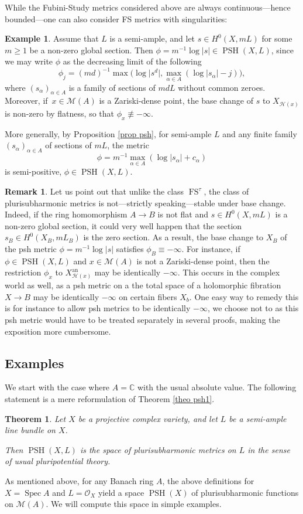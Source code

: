 \documentclass[JEP,XML,SOM,Unicode,published]{cedram}
\newtheorem{theo}[equation]{Theorem}
\theoremstyle{definition}
\newtheorem{ex}[equation]{Example}
\newtheorem{rem}[equation]{Remark}
\newcommand \C{\mathbb C}
\newcommand \gO {\mathcal O}
\newcommand \M {\mathscr {M}}
\newcommand{\an}{\mathrm{an}}
\DeclareMathOperator{\FS}{FS}
\DeclareMathOperator{\PSH}{PSH}
\DeclareMathOperator{\Sp}{Spec}
\begin{document}
While the Fubini-Study metrics considered above are always continuous---hence bounded---one can also consider FS metrics with singularities:
\begin{ex} \label{ex fs sing} Assume that $L$ is a semi-ample, and let $s \in H^0(X, mL)$ for some $m \ge 1$ be a non-zero global section. Then $ \phi =m^{-1} \log \lvert s \rvert \in \PSH(X, L)$, since we may write $\phi$ as the decreasing limit of the following
\[
\phi_j =(md)^{-1} \max \bigl(\log \lvert s^d \rvert , \max_{\alpha \in A} (\log \lvert s_{\alpha} \rvert -j) \bigr),
\]
where $(s_{\alpha})_{\alpha \in A}$ is a family of sections of $mdL$ without common zeroes. Moreover, if~$x \in \M(A)$ is a Zariski-dense point, the base change of $s$ to $X_{\mathscr{H}(x)}$ is non-zero by flatness, so that $\phi_x \not\equiv - \infty$.

More generally, by Proposition \ref{prop psh}, for semi-ample $L$ and any finite family $(s_{\alpha})_{\alpha \in A}$ of sections of $mL$, the metric
\[
\phi = m^{-1} \max_{\alpha \in A} (\log \lvert s_{\alpha} \rvert + c_{\alpha})
\]
is semi-positive, \ie $\phi \in \PSH(X,L)$.
\end{ex}
\begin{rem}
Let us point out that unlike the class $\FS^{\tau}$, the class of plurisubharmonic metrics is not---strictly speaking---stable under base change. Indeed, if the ring homomorphism $A \to B$ is not flat and $s \in H^0(X, mL)$ is a non-zero global section, it could very well happen that the section $s_B \in H^0(X_B, mL_B)$ is the zero section. As a result, the base change to $X_B$ of the psh metric $\phi =m^{-1} \log \lvert s \vert$ satisfies $\phi_B \equiv - \infty$. For instance, if $\phi \in \PSH(X, L)$ and $x \in \M(A)$ is not a Zariski-dense point, then the restriction $\phi_x$ to $X^{\an}_{\mathscr{H}(x)}$ may be identically $-\infty$.
This occurs in the complex world as well, as a psh metric on a the total space of a holomorphic fibration $X \to B$ may be identically $- \infty$ on certain fibers $X_b$. One easy way to remedy this is for instance to allow psh metrics to be identically $-\infty$, we choose not to as this psh metric would have to be treated separately in several proofs, making the exposition more cumbersome.
\end{rem}
\subsection{Examples}
We start with the case where $A=\C$ with the usual absolute value. The following statement is a mere reformulation of Theorem \ref{theo psh1}.\begin{theo} \label{theo psh2} Let $X$ be a projective complex variety, and let $L$ be a semi-ample line bundle on $X$.

Then $\PSH(X, L)$ is the space of plurisubharmonic metrics on $L$ in the sense of usual pluripotential theory.
\end{theo}
As mentioned above, for any Banach ring $A$, the above definitions for $X= \Sp A$ and $L= \gO_X$ yield a space $\PSH(X)$ of plurisubharmonic functions on $\mathscr{M}(A)$. We will compute this space in simple examples.
\end{document}
